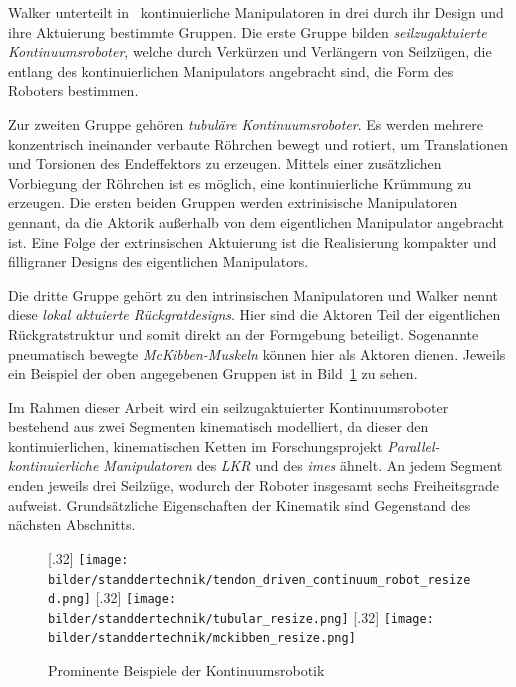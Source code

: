 Walker unterteilt in~\cite{Wal13} kontinuierliche Manipulatoren in drei durch ihr Design und ihre Aktuierung bestimmte Gruppen. Die erste Gruppe bilden \textit{seilzugaktuierte Kontinuumsroboter}, welche durch Verkürzen und Verlängern von Seilzügen, die entlang des kontinuierlichen Manipulators angebracht sind, die Form des Roboters bestimmen. 

Zur zweiten Gruppe gehören \textit{tubuläre Kontinuumsroboter}. Es werden mehrere konzentrisch ineinander verbaute Röhrchen bewegt und rotiert, um Translationen und Torsionen des Endeffektors zu erzeugen. Mittels einer zusätzlichen Vorbiegung der Röhrchen ist es möglich, eine kontinuierliche Krümmung zu erzeugen. 
Die ersten beiden Gruppen werden extrinisische Manipulatoren gennant, da die Aktorik außerhalb von dem eigentlichen Manipulator angebracht ist. Eine Folge der extrinsischen Aktuierung ist die Realisierung kompakter und filligraner Designs des eigentlichen Manipulators. 

Die dritte Gruppe gehört zu den intrinsischen Manipulatoren und Walker nennt diese \textit{lokal aktuierte Rückgratdesigns}. Hier sind die Aktoren Teil der eigentlichen Rückgratstruktur und somit direkt an der Formgebung beteiligt. Sogenannte pneumatisch bewegte \textit{McKibben-Muskeln} können hier als Aktoren dienen. Jeweils ein Beispiel der oben angegebenen Gruppen ist in Bild~\ref{fig:dreiKontinuumsRoboter} zu sehen. \newline

Im Rahmen dieser Arbeit wird ein seilzugaktuierter Kontinuumsroboter bestehend aus zwei Segmenten kinematisch modelliert, da dieser den kontinuierlichen, kinematischen Ketten im Forschungsprojekt \textit{Parallel-kontinuierliche Manipulatoren} des \textit{LKR} und des \textit{imes} ähnelt. An jedem Segment enden jeweils drei Seilzüge, wodurch der Roboter insgesamt sechs Freiheitsgrade aufweist. Grundsätzliche Eigenschaften der Kinematik sind Gegenstand des nächsten Abschnitts.

\begin{figure}[t!]
\centering
{}[.32\linewidth]
{\texttt{[image: bilder/standdertechnik/tendon\_driven\_continuum\_robot\_resized.png]}}
\label{fig:seilzugaktuiert}
[.32\linewidth]
{\texttt{[image: bilder/standdertechnik/tubular\_resize.png]}}
\label{fig:tubulaer}
[.32\linewidth]
{\texttt{[image: bilder/standdertechnik/mckibben\_resize.png]}}
\caption[Prominente Beispiele der Kontinuumsrobotik]{Prominente Beispiele der Kontinuumsrobotik}
\label{fig:dreiKontinuumsRoboter}
\end{figure}

